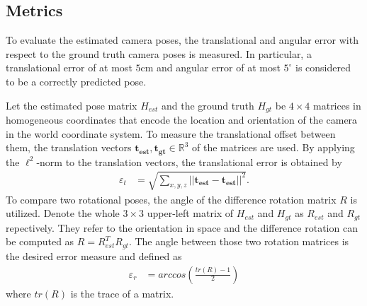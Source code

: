 \documentclass[final]{cvpr}
\begin{document}
\subsection{Metrics} \label{subsec:metrics}
To evaluate the estimated camera poses, the translational and angular error with respect to the 
ground truth camera poses is measured. In particular, a translational error of at 
most $5$cm and angular error of at most $5^{\circ}$ is considered to be a correctly predicted pose. 

Let the estimated pose matrix $H_{est}$ and the ground truth $H_{gt}$ be $4 \times 4$ matrices
in homogeneous coordinates that encode the location and orientation of the camera in the world 
coordinate system. To measure the translational offset between them, the translation vectors 
$\boldsymbol{t_{est}}, \boldsymbol{t_{gt}} \in \mathbb{R}^3$ of the matrices are used.
By applying the $\ell^2$-norm to the translation vectors, the translational error is obtained by
\begin{align}
    \varepsilon_t &= \sqrt{\sum_{x,y,z}||\boldsymbol{t_{est}} - \boldsymbol{t_{est}}||^2}.
\end{align}
To compare two rotational poses, the angle of the difference rotation matrix $R$ is utilized. 
Denote the whole $3\times3$ upper-left matrix of $H_{est}$ and $H_{gt}$ as $R_{est}$ and 
$R_{gt}$ repectively. They refer to the orientation in space and the difference rotation can be computed 
as $R = R_{est}^TR_{gt}$. The angle between those two rotation matrices is the desired
error measure and defined as
\begin{align}
    \varepsilon_r &= arccos \left( \frac{tr(R)-1}{2} \right)
\end{align}
where $tr(R)$ is the trace of a matrix.


\end{document}
